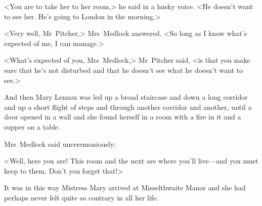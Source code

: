 <You are to take her to her room,> he said in a husky voice. <He doesn't want to see her. He's going to London in the morning.>

<Very well, Mr~Pitcher,> Mrs~Medlock answered. <So long as I know what's expected of me, I can manage.>

<What's expected of you, Mrs~Medlock,> Mr~Pitcher said, <is that you make sure that he's not disturbed and that he doesn't see what he doesn't want to see.>

And then Mary Lennox was led up a broad staircase and down a long corridor and up a short flight of steps and through another corridor and another, until a door opened in a wall and she found herself in a room with a fire in it and a supper on a table.

Mrs~Medlock said unceremoniously:

<Well, here you are! This room and the next are where you'll live—and you must keep to them. Don't you forget that!>

It was in this way Mistress Mary arrived at Misselthwaite Manor and she had perhaps never felt quite so contrary in all her life.

\begin{letter}
\enlargethispage{\baselineskip}
\end{letter}